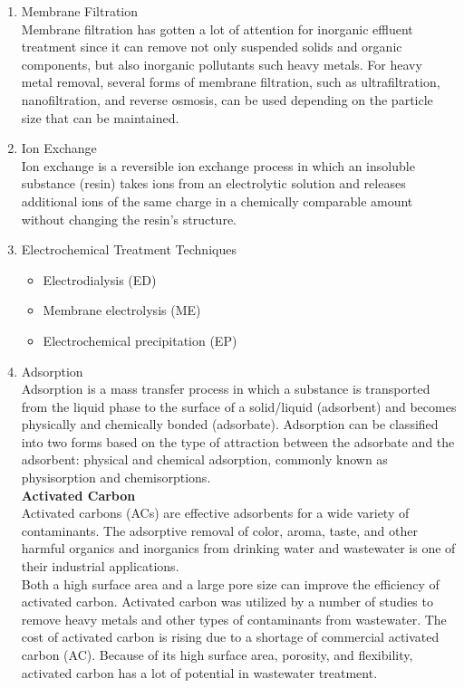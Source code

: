 \begin{enumerate}
\item Membrane Filtration\\
Membrane filtration has gotten a lot of attention for inorganic effluent treatment since it can remove not only suspended solids and organic components, but also inorganic pollutants such heavy metals. For heavy metal removal, several forms of membrane filtration, such as ultrafiltration, nanofiltration, and reverse osmosis, can be used depending on the particle size that can be maintained. 
\item Ion Exchange\\
Ion exchange is a reversible ion exchange process in which an insoluble substance (resin) takes ions from an electrolytic solution and releases additional ions of the same charge in a chemically comparable amount without changing the resin's structure.
\item Electrochemical Treatment Techniques\\
\begin{itemize}
\item Electrodialysis (ED)
\item Membrane electrolysis (ME)
\item Electrochemical precipitation (EP)
\end{itemize}
\item Adsorption\\
Adsorption is a mass transfer process in which a substance is transported from the liquid phase to the surface of a solid/liquid (adsorbent) and becomes physically and chemically bonded (adsorbate). Adsorption can be classified into two forms based on the type of attraction between the adsorbate and the adsorbent: physical and chemical adsorption, commonly known as physisorption and chemisorptions.\\
\textbf{Activated Carbon}\\
Activated carbons (ACs) are effective adsorbents for a wide variety of contaminants. The adsorptive removal of color, aroma, taste, and other harmful organics and inorganics from drinking water and wastewater is one of their industrial applications.\\
Both a high surface area and a large pore size can improve the efficiency of activated carbon. Activated carbon was utilized by a number of studies to remove heavy metals and other types of contaminants from wastewater. The cost of activated carbon is rising due to a shortage of commercial activated carbon (AC). Because of its high surface area, porosity, and flexibility, activated carbon has a lot of potential in wastewater treatment.\\ 

\end{enumerate}
